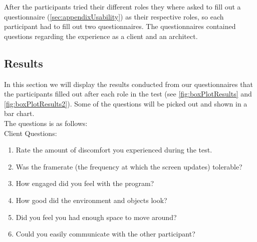 After the participants tried their different roles they where asked to fill out a questionnaire (\ref{sec:appendixUsability}) as their respective roles, so each participant had to fill out two questionnaires. The questionnaires contained questions regarding the experience as a client and an architect.

\subsection{Results}
In this section we will display the results conducted from our questionnaires that the participants filled out after each role in the test (see \autoref{fig:boxPlotResults} and \autoref{fig:boxPlotResults2}). Some of the questions will be picked out and shown in a bar chart.\\
The questions is as follows:\\

Client Questions:\\
\begin{enumerate}
\item Rate the amount of discomfort you experienced during the test.
\item Was the framerate (the frequency at which the screen updates) tolerable?
\item How engaged did you feel with the program?
\item How good did the environment and objects look?
\item Did you feel you had enough space to move around?
\item Could you easily communicate with the other participant?
\end{enumerate}


